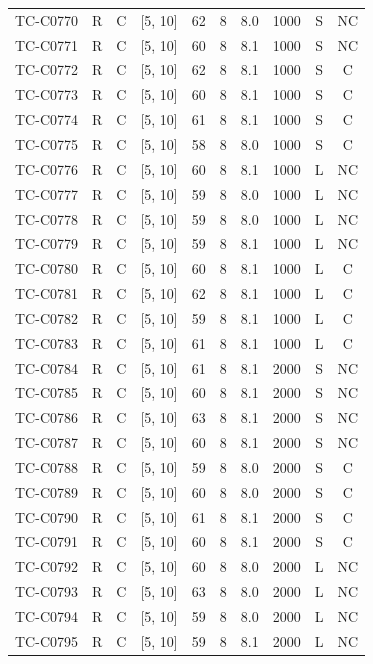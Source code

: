 \begin{longtable}{lccccccccc}
TC-C0770 & R & C & [5, 10] & 62 & 8 & 8.0 & 1000 & S & NC \\
TC-C0771 & R & C & [5, 10] & 60 & 8 & 8.1 & 1000 & S & NC \\
TC-C0772 & R & C & [5, 10] & 62 & 8 & 8.1 & 1000 & S & C \\
TC-C0773 & R & C & [5, 10] & 60 & 8 & 8.1 & 1000 & S & C \\
TC-C0774 & R & C & [5, 10] & 61 & 8 & 8.1 & 1000 & S & C \\
TC-C0775 & R & C & [5, 10] & 58 & 8 & 8.0 & 1000 & S & C \\
TC-C0776 & R & C & [5, 10] & 60 & 8 & 8.1 & 1000 & L & NC \\
TC-C0777 & R & C & [5, 10] & 59 & 8 & 8.0 & 1000 & L & NC \\
TC-C0778 & R & C & [5, 10] & 59 & 8 & 8.0 & 1000 & L & NC \\
TC-C0779 & R & C & [5, 10] & 59 & 8 & 8.1 & 1000 & L & NC \\
TC-C0780 & R & C & [5, 10] & 60 & 8 & 8.1 & 1000 & L & C \\
TC-C0781 & R & C & [5, 10] & 62 & 8 & 8.1 & 1000 & L & C \\
TC-C0782 & R & C & [5, 10] & 59 & 8 & 8.1 & 1000 & L & C \\
TC-C0783 & R & C & [5, 10] & 61 & 8 & 8.1 & 1000 & L & C \\
TC-C0784 & R & C & [5, 10] & 61 & 8 & 8.1 & 2000 & S & NC \\
TC-C0785 & R & C & [5, 10] & 60 & 8 & 8.1 & 2000 & S & NC \\
TC-C0786 & R & C & [5, 10] & 63 & 8 & 8.1 & 2000 & S & NC \\
TC-C0787 & R & C & [5, 10] & 60 & 8 & 8.1 & 2000 & S & NC \\
TC-C0788 & R & C & [5, 10] & 59 & 8 & 8.0 & 2000 & S & C \\
TC-C0789 & R & C & [5, 10] & 60 & 8 & 8.0 & 2000 & S & C \\
TC-C0790 & R & C & [5, 10] & 61 & 8 & 8.1 & 2000 & S & C \\
TC-C0791 & R & C & [5, 10] & 60 & 8 & 8.1 & 2000 & S & C \\
TC-C0792 & R & C & [5, 10] & 60 & 8 & 8.0 & 2000 & L & NC \\
TC-C0793 & R & C & [5, 10] & 63 & 8 & 8.0 & 2000 & L & NC \\
TC-C0794 & R & C & [5, 10] & 59 & 8 & 8.0 & 2000 & L & NC \\
TC-C0795 & R & C & [5, 10] & 59 & 8 & 8.1 & 2000 & L & NC \\

\end{longtable}

